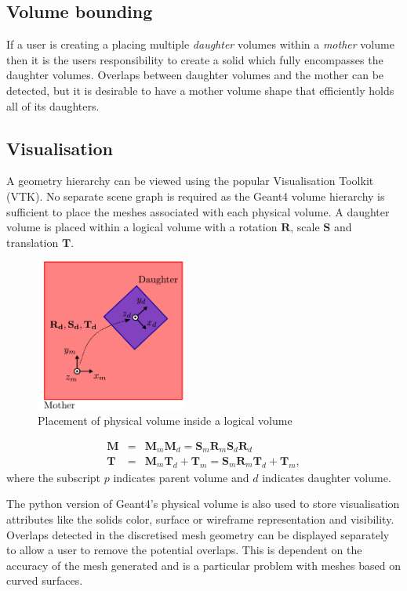 \documentclass[final,5p,times,twocolumn]{elsarticle}
\begin{document}
\subsection{Volume bounding} 
If a user is creating a placing multiple {\em daughter} volumes within a {\em mother} volume then it is the users responsibility to create a solid which fully encompasses the 
daughter volumes. Overlaps between daughter volumes and the mother can be detected, but it is desirable to have a mother volume shape that efficiently holds all of its daughters. 
 
\subsection{Visualisation} \label{sec:visualisation}
A  geometry hierarchy can be viewed using the popular Visualisation Toolkit (VTK). No separate scene graph is required as the Geant4 volume hierarchy is sufficient 
to place the meshes associated with each physical volume. A daughter volume is placed within a logical volume with a rotation $\mathbf{R}$, scale $\mathbf{S}$ and 
translation $\mathbf{T}$.

\begin{figure}[htbp]
\begin{center}
\includegraphics[width=5cm]{./diagrams/lvToPv.pdf}
\caption{Placement of physical volume inside a logical volume}
\label{fig:lvToPv}
\end{center}
\end{figure} 

\begin{eqnarray}
\mathbf{M}	  	& = & \mathbf{M}_m \mathbf{M}_d  = \mathbf{S}_m \mathbf{R}_m  \mathbf{S}_d \mathbf{R}_d\\
\mathbf{T}	 		& = & \mathbf{M}_m \mathbf{T}_d + \mathbf{T}_m= \mathbf{S}_m \mathbf{R}_m \mathbf{T}_d + \mathbf{T}_m,
\end{eqnarray}
where the subscript $p$ indicates parent volume and $d$ indicates daughter volume.

The python version of Geant4's physical volume is also used to store visualisation attributes like the solids 
color, surface or wireframe representation and visibility. Overlaps detected in the discretised mesh geometry can be displayed separately to allow a user to remove
the potential overlaps. This is dependent on the accuracy of the mesh generated and is a particular problem with meshes based on curved surfaces.    
\end{document}
